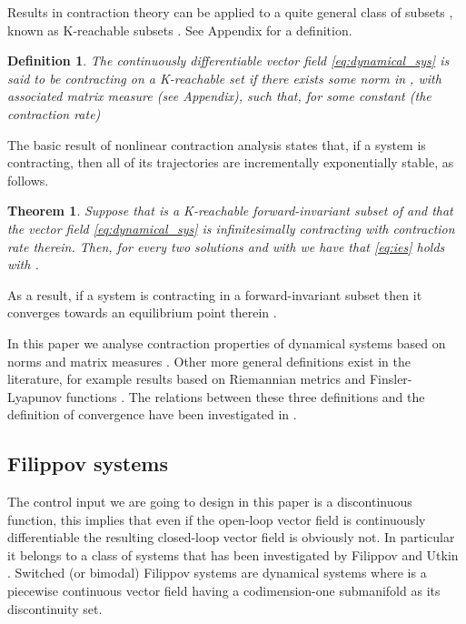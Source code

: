 \documentclass[letterpaper, 10 pt, conference]{ieeeconf}
\newtheorem{theorem}{Theorem}
\newtheorem{definition}{Definition}
\begin{document}
Results in contraction theory can be applied to a quite general class of subsets , known as K-reachable subsets \cite{russo2010global}. See Appendix for a definition.

\begin{definition}
\label{def:contraction}
The continuously differentiable vector field \eqref{eq:dynamical_sys} is said to be \emph{contracting} on a K-reachable set  if there exists some norm in , with associated matrix measure  (see Appendix), such that, for some constant  (the \emph{contraction rate})

\end{definition}
\vspace{0.2cm}
The basic result of nonlinear contraction analysis states that, if a system is contracting, then all of its trajectories are incrementally exponentially stable, as follows.
\begin{theorem}
\label{thm:contraction}
Suppose that  is a K-reachable forward-invariant subset of  and that the vector field \eqref{eq:dynamical_sys} is infinitesimally contracting with contraction rate  therein. Then, for every two solutions  and  with  we have that \eqref{eq:ies} holds with .
\end{theorem}
As a result, if a system is contracting in a forward-invariant subset then it converges towards an equilibrium point therein \cite{russo2010global,lohmiller1998contraction}.

In this paper we analyse contraction properties of dynamical systems based on norms and matrix measures \cite{russo2010global}. Other more general definitions exist in the literature, for example results based on Riemannian metrics \cite{lohmiller1998contraction} and Finsler-Lyapunov functions \cite{forni2014differential}. The relations between these three definitions and the definition of convergence \cite{pavlov2004convergent} have been investigated in \cite{forni2014differential}.

\subsection{Filippov systems}
The control input  we are going to design in this paper is a discontinuous function, this implies that even if the open-loop vector field is continuously differentiable the resulting closed-loop vector field is obviously not. In particular it belongs to a class of systems that has been investigated by Filippov \cite{filippov1988differential} and Utkin \cite{utkin2013sliding}. Switched (or bimodal) Filippov systems are dynamical systems  where  is a piecewise continuous vector field having a codimension-one submanifold  as its discontinuity set.
 
\end{document}
